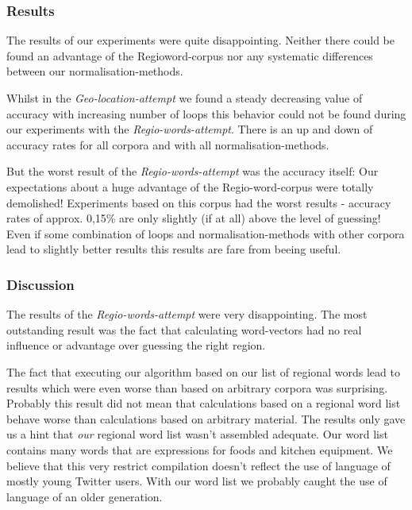 \documentclass[./Main.tex]{subfiles}
\begin{document}
\subsubsection{Results}
The results of our experiments were quite disappointing. Neither there could be found an advantage of the Regioword-corpus nor any systematic differences between our normalisation-methods.

Whilst in the \emph{Geo-location-attempt} we found a steady decreasing value of accuracy with increasing number of loops this behavior could not be found during our experiments with the \emph{Regio-words-attempt}. There is an up and down of accuracy rates for all corpora and with all normalisation-methods.

But the worst result of the \emph{Regio-words-attempt} was the accuracy itself: Our expectations about a huge advantage of the Regio-word-corpus were totally demolished! Experiments based on this corpus had the worst results - accuracy rates of approx. 0,15\% are only slightly (if at all) above the level of guessing! Even if some combination of loops and normalisation-methods with other corpora lead to slightly better results this results are fare from beeing useful.

\subsubsection{Discussion}
The results of the \emph{Regio-words-attempt} were very disappointing. The most outstanding result was the fact that calculating word-vectors had no real influence or advantage over guessing the right region.

The fact that executing our algorithm based on our list of regional words lead to results which were even worse than based on arbitrary corpora was surprising. Probably this result did not mean that calculations based on a regional word list behave worse than calculations based on arbitrary material. The results only gave us a hint that \emph{our} regional word list wasn't assembled adequate. Our word list contains many words that are expressions for foods and kitchen equipment. We believe that this very restrict compilation doesn't reflect the use of language of mostly young Twitter users. With our word list we probably caught the use of language of an older generation.
\end{document}
